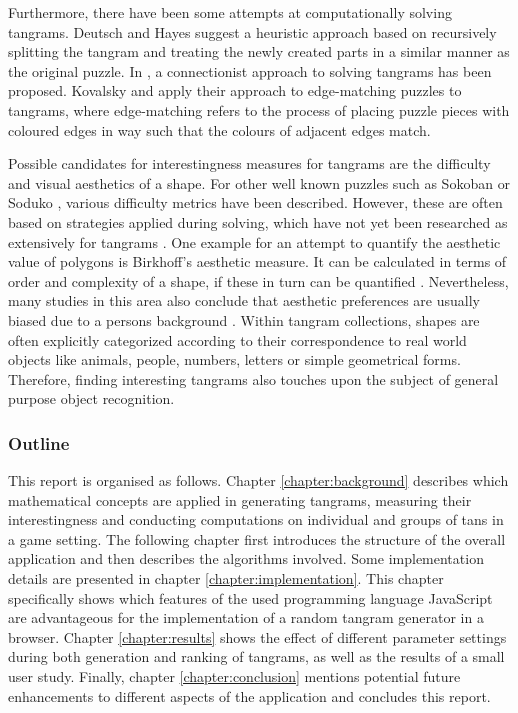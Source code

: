 Furthermore, there have been some attempts at computationally solving tangrams. Deutsch and Hayes \cite{deutsch72} suggest a heuristic approach based on recursively splitting the tangram and treating the newly created parts in a similar manner as the original puzzle. In \cite{oflazer93}, a connectionist approach to solving tangrams has been proposed. Kovalsky and \cite{kovalsky14} apply their approach to edge-matching puzzles to tangrams, where edge-matching refers to the process of placing puzzle pieces with coloured edges in way such that the colours of adjacent edges match.

Possible candidates for interestingness measures for tangrams are the difficulty and visual aesthetics of a shape. For other well known puzzles such as Sokoban \cite{jaruvsek10} or Soduko \cite{hunt07}, various difficulty metrics have been described. However, these are often based on strategies applied during solving, which have not yet been researched as extensively for tangrams \cite{baran07}. One example for an attempt to quantify the aesthetic value of polygons is Birkhoff's aesthetic measure. It can be calculated in terms of order and complexity of a shape, if these in turn can be quantified \cite{filonik09}. Nevertheless, many studies in this area also conclude that aesthetic preferences are usually biased due to a persons background \cite{eberle14}. Within tangram collections, shapes are often explicitly categorized according to their correspondence to real world objects like animals, people, numbers, letters or simple geometrical forms. Therefore, finding interesting tangrams also touches upon the subject of general purpose object recognition. 

\subsubsection*{Outline}

This report is organised as follows. Chapter \ref{chapter:background} describes which mathematical concepts are applied in generating tangrams, measuring their interestingness and conducting computations on individual and groups of tans in a game setting. The following chapter first introduces the structure of the overall application and then describes the algorithms involved. Some implementation details are presented in chapter \ref{chapter:implementation}. This chapter specifically shows which features of the used programming language JavaScript are advantageous for the implementation of a random tangram generator in a browser. Chapter \ref{chapter:results} shows the effect of different parameter settings during both generation and ranking of tangrams, as well as the results of a small user study. Finally, chapter \ref{chapter:conclusion} mentions potential future enhancements to different aspects of the application and concludes this report.
